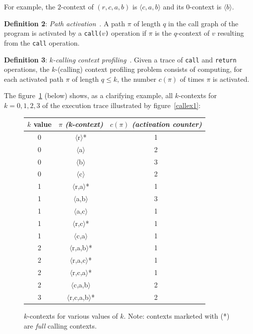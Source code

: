 \documentclass[a4paper,10pt]{report}
\begin{document}
For example, the $2$-context of $(r,c,a,b)$ is $\langle c,a,b\rangle$ and its $0$-context is $\langle b\rangle$.

\textbf{Definition 2}: \emph{Path activation}~\cite{kccf}. 
A path $\pi$ of length $q$ in the call graph of the program is activated by 
a \texttt{call(}$v$\texttt{)}
operation if $\pi$ is the $q$-context of $v$ resulting from the \texttt{call} operation.

\textbf{Definition 3}: \emph{$k$-calling context profiling}~\cite{kccf}. Given a trace
of \texttt{call} and \texttt{return} operations, the $k$-(calling) context
profiling problem consists of computing, for each activated path $\pi$ of length $q\le k$, the number $c(\pi)$ of times $\pi$ is activated.

The figure~\ref{kctx1} (below) shows, as a clarifying example, all $k$-contexts for $k=0,1,2,3$ of the execution trace illustrated by figure~\ref{callex1}:

\begin{figure}[h]
\begin{center}
\begin{tabular}{c|c|c}
$k$ value & \textbf{$\pi$} \emph{(k-context)} & $c(\pi)$ \emph{(activation counter)}\\
\hline
0 & $\langle$r$\rangle$* & 1\\
0 & $\langle$a$\rangle$ & 2\\
0 & $\langle$b$\rangle$ & 3\\
0 & $\langle$c$\rangle$ & 2\\
\hline
1 & $\langle$r,a$\rangle$* & 1\\
1 & $\langle$a,b$\rangle$ & 3\\
1 & $\langle$a,c$\rangle$ & 1\\
1 & $\langle$r,c$\rangle$* & 1\\
1 & $\langle$c,a$\rangle$ & 1\\
\hline
2 & $\langle$r,a,b$\rangle$* & 1\\
2 & $\langle$r,a,c$\rangle$* & 1\\
2 & $\langle$r,c,a$\rangle$* & 1\\
2 & $\langle$c,a,b$\rangle$ & 2\\
\hline
3 & $\langle$r,c,a,b$\rangle$* & 2\\

\end{tabular}
\end{center}
\caption{$k$-contexts for various values of $k$.
Note: contexts marketed with (*) are \emph{full} calling contexts.}
\label{kctx1}
\end{figure}
\end{document}
